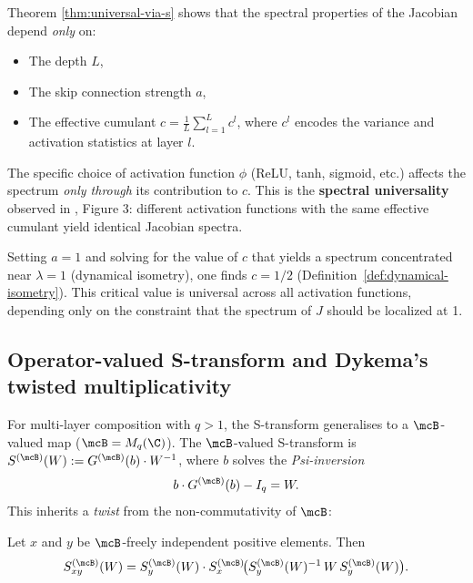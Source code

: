 \begin{remark}
Theorem \ref{thm:universal-via-s} shows that the spectral properties of the Jacobian depend \emph{only} on:
\begin{itemize}
\item The depth $L$,
\item The skip connection strength $a$,
\item The effective cumulant $c = \frac{1}{L}\sum_{l=1}^L c^l$, where $c^l$ encodes the variance and activation statistics at layer $l$.
\end{itemize}

The specific choice of activation function $\phi$ (ReLU, tanh, sigmoid, etc.) affects the spectrum \emph{only through} its contribution to $c$. This is the \textbf{spectral universality} observed in \cite{tarnowski2019dynamical}, Figure 3: different activation functions with the same effective cumulant yield identical Jacobian spectra.
\end{remark}

\begin{remark}
Setting $a = 1$ and solving for the value of $c$ that yields a spectrum concentrated near $\lambda = 1$ (dynamical isometry), one finds $c = 1/2$ (Definition~\ref{def:dynamical-isometry}). This critical value is universal across all activation functions, depending only on the constraint that the spectrum of $J$ should be localized at 1.
\end{remark}

\subsection{Operator-valued S-transform and Dykema's twisted multiplicativity}\label{app:ov-s-transform}

For multi-layer composition with $q > 1$, the S-transform generalises to a $\mcB$-valued map ($\mcB = M_q(\C)$). The $\mcB$-valued S-transform is $S^{(\mcB)}(W) := G^{(\mcB)}(b) \cdot W^{-1}$, where $b$ solves the \emph{Psi-inversion}
\begin{equation}\label{eq:psi-inversion}
b \cdot G^{(\mcB)}(b) - I_q = W.
\end{equation}
This inherits a \emph{twist} from the non-commutativity of $\mcB$:

\begin{theorem}[Dykema, 2006]\label{thm:dykema}
Let $x$ and $y$ be $\mcB$-freely independent positive elements. Then
\begin{equation}\label{eq:twisted-mult}
S^{(\mcB)}_{xy}(W) = S^{(\mcB)}_y(W) \cdot S^{(\mcB)}_x\!\bigl(S^{(\mcB)}_y(W)^{-1} \, W \, S^{(\mcB)}_y(W)\bigr).
\end{equation}
\end{theorem}


